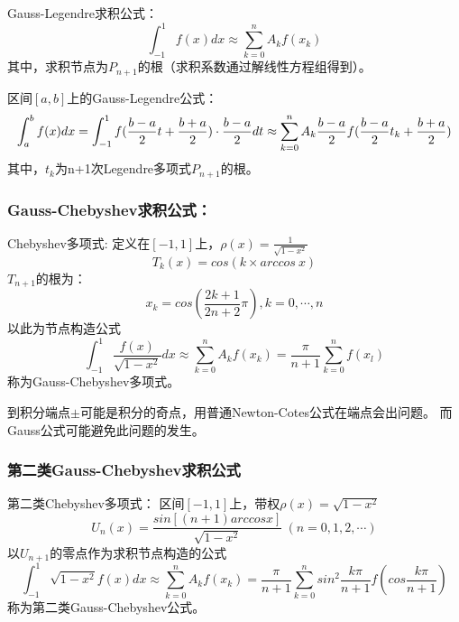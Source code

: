 Gauss-Legendre求积公式：
\begin{equation}
    \int_{-1}^{1}f(x)dx \approx \sum_{k=0}^{n}A_kf(x_k)
\end{equation}
其中，求积节点为$P_{n+1}$的根（求积系数通过解线性方程组得到）。

区间$[a,b]$上的Gauss-Legendre公式：
\begin{equation}
    \int_{a}^{b}f(x)dx = \int_{-1}^{1}f(\frac{b-a}{2}t+\frac{b+a}{2})\cdot \frac{b-a}{2}dt\\
    \\\approx\sum_{k=0}^{n}A_k\frac{b-a}{2}f(\frac{b-a}{2}t_k+\frac{b+a}{2})
\end{equation}
其中，$t_k$为n+1次Legendre多项式$P_{n+1}$的根。

\subsubsection{Gauss-Chebyshev求积公式：}

Chebyshev多项式:
定义在$[-1,1]$上，$\rho(x) = \frac{1}{\sqrt{1-x^2}}$
\begin{equation*}
    T_k(x) = cos(k \times arccos\ x)
\end{equation*}
$T_{n+1}$的根为：
\begin{equation*}
    x_k = cos(\frac{2k+1}{2n+2}\pi ), k = 0,\cdots, n
\end{equation*}
以此为节点构造公式
\begin{equation*}
    \int_{-1}^{1}\frac{f(x)}{\sqrt{1-x^2}}dx \approx \sum_{k=0}^{n}A_kf(x_k) = \frac{\pi}{n+1}\sum_{k=0}^{n}f(x_l)
\end{equation*}
称为Gauss-Chebyshev多项式。
\begin{remark}
    到积分端点$\pm $可能是积分的奇点，用普通Newton-Cotes公式在端点会出问题。
    而Gauss公式可能避免此问题的发生。
\end{remark}

\subsubsection{第二类Gauss-Chebyshev求积公式}

第二类Chebyshev多项式：
区间$[-1,1]$上，带权$\rho(x) = \sqrt{1-x^2}$
\begin{equation*}
    U_n(x) = \frac{sin[(n+1)arccosx]}{\sqrt{1-x^2}}\    (n=0,1,2,\cdots)
\end{equation*}
以$U_{n+1}$的零点作为求积节点构造的公式
\begin{equation*}
    \int_{-1}^{1}\sqrt{1-x^2}f(x)dx \approx \sum_{k=0}^{n}A_kf(x_k) = \frac{\pi}{n+1}\sum_{k=0}^{n}sin^2\frac{k\pi}{n+1}f(cos\frac{k\pi}{n+1})
\end{equation*}
称为第二类Gauss-Chebyshev公式。

